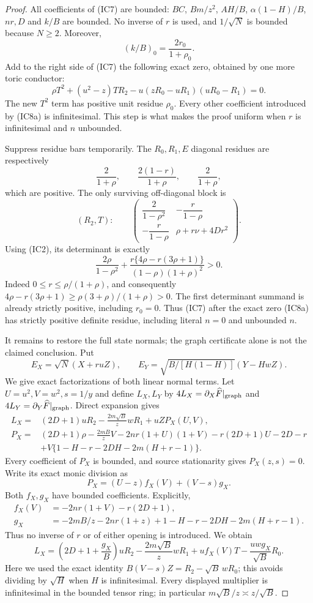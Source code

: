 \begin{proof}
All coefficients of (IC7) are bounded: $BC$, $Bm/z^2$, $AH/B$,
$\alpha(1-H)/B$, $nr,D$ and $k/B$ are bounded. No inverse of $r$
is used, and $1/\sqrt N$ is bounded because $N\ge2$. Moreover,
\[
 (k/B)_0=\frac{2r_0}{1+\rho_0}.
\]
Add to the right side of (IC7) the following exact zero, obtained
by one more toric conductor:
\[
 \rho T^2+(u^2-z)TR_2
       -u(zR_0-uR_1)(uR_0-R_1)=0.                    \tag{IC8a}
\]
The new $T^2$ term has positive unit residue $\rho_0$. Every other
coefficient introduced by (IC8a) is infinitesimal. This step is what
makes the proof uniform when $r$ is infinitesimal and $n$ unbounded.

Suppress residue bars temporarily. The $R_0,R_1,E$ diagonal
residues are respectively
\[
 \frac2{1+\rho},\qquad
 \frac{2(1-r)}{1+\rho},\qquad
 \frac2{1+\rho},
\]
which are positive. The only surviving off-diagonal block is
\[
 (R_2,T):\qquad
 \begin{pmatrix}
 \dfrac2{1-\rho^2}&-\dfrac r{1-\rho}\\[3pt]
 -\dfrac r{1-\rho}&\rho+r\nu+4Dr^2
 \end{pmatrix}.                                      \tag{IC9}
\]
Using (IC2), its determinant is exactly
\[
 \frac{2\rho}{1-\rho^2}
  +\frac{r\{4\rho-r(3\rho+1)\}}
       {(1-\rho)(1+\rho)^2}>0.
\]
Indeed $0\le r\le\rho/(1+\rho)$, and consequently
$4\rho-r(3\rho+1)\ge\rho(3+\rho)/(1+\rho)>0$.
The first determinant summand is already strictly positive, including
$r_0=0$. Thus (IC7) after the exact zero (IC8a) has strictly positive
definite residue, including literal $n=0$ and unbounded $n$.

It remains to restore the full state normals; the graph certificate
alone is not the claimed conclusion. Put
\[
 E_X=\sqrt N(X+ruZ),\qquad E_Y=\sqrt{B/[H(1-H)]}(Y-HwZ).
\]
We give exact factorizations of both linear normal terms. Let
$U=u^2,V=w^2,s=1/y$ and define $L_X,L_Y$ by
$4L_X=\partial_X\widehat F|_{\rm graph}$ and
$4L_Y=\partial_Y\widehat F|_{\rm graph}$. Direct expansion gives
\begin{align*}
 L_X={}&(2D+1)uR_2-\frac{2m\sqrt B}{z}wR_1+uZP_X(U,V),\\
 P_X={}&(2D+1)\rho-\frac{2mB}{z}V
    -2nr(1+U)(1+V)-r(2D+1)U-2D-r\\
 &+V\{1-H-r-2DH-2m(H+r-1)\}.                         \tag{IC10}
\end{align*}
Every coefficient of $P_X$ is bounded, and source stationarity gives
$P_X(z,s)=0$. Write its exact monic division as
\[
 P_X=(U-z)f_X(V)+(V-s)g_X.
\]
Both $f_X,g_X$ have bounded coefficients. Explicitly,
\begin{align*}
 f_X(V)&=-2nr(1+V)-r(2D+1),\\
 g_X&=-2mB/z-2nr(1+z)+1-H-r-2DH-2m(H+r-1).
\end{align*}
Thus no inverse of $r$ or of either opening is introduced. We obtain
\[
 L_X=\left(2D+1+\frac{g_X}B\right)uR_2
       -\frac{2m\sqrt B}{z}wR_1
       +u f_X(V)T
       -\frac{uwg_X}{\sqrt B}R_0.                       \tag{IC11}
\]
Here we used the exact identity
$B(V-s)Z=R_2-\sqrt B\,wR_0$; this avoids dividing by $\sqrt H$
when $H$ is infinitesimal. Every displayed multiplier is infinitesimal
in the bounded tensor ring; in particular $m\sqrt B/z\asymp z/\sqrt B$.


\end{proof}
